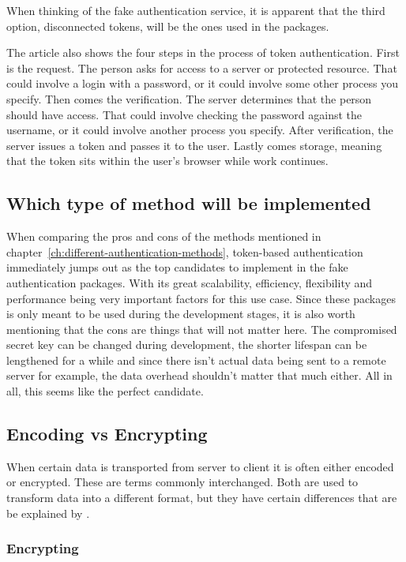 When thinking of the fake authentication service, it is apparent that the third option, disconnected tokens, will be the ones used in the packages.

The article also shows the four steps in the process of token authentication. First is the request. The person asks for access to a server or protected resource. That could involve a login with a password, or it could involve some other process you specify. Then comes the verification. The server determines that the person should have access. That could involve checking the password against the username, or it could involve another process you specify. After verification, the server issues a token and passes it to the user. Lastly comes storage, meaning that the token sits within the user's browser while work continues.

\subsection{Which type of method will be implemented}

When comparing the pros and cons of the methods mentioned in chapter~\ref{ch:different-authentication-methods}, token-based authentication immediately jumps out as the top candidates to implement in the fake authentication packages. With its great scalability, efficiency, flexibility and performance being very important factors for this use case. Since these packages is only meant to be used during the development stages, it is also worth mentioning that the cons are things that will not matter here. The compromised secret key can be changed during development, the shorter lifespan can be lengthened for a while and since there isn't actual data being sent to a remote server for example, the data overhead shouldn't matter that much either. All in all, this seems like the perfect candidate.

\subsection{Encoding vs Encrypting}

When certain data is transported from server to client it is often either encoded or encrypted. These are terms commonly interchanged. Both are used to transform data into a different format, but they have certain differences that are be explained by \textcite{CoderSaty}.

\subsubsection{Encrypting}

